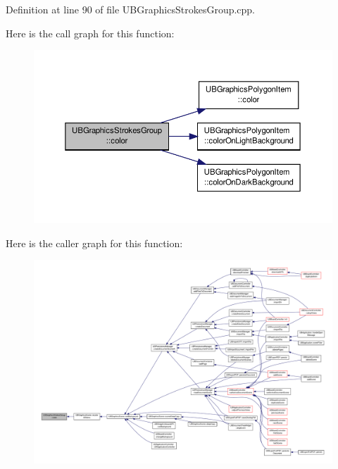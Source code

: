 Definition at line 90 of file U\-B\-Graphics\-Strokes\-Group.\-cpp.



Here is the call graph for this function\-:
\nopagebreak
\begin{figure}[H]
\begin{center}
\leavevmode
\includegraphics[width=350pt]{d3/d0b/class_u_b_graphics_strokes_group_a658c2ce6d14f05667601f76c5252a733_cgraph}
\end{center}
\end{figure}




Here is the caller graph for this function\-:
\nopagebreak
\begin{figure}[H]
\begin{center}
\leavevmode
\includegraphics[width=350pt]{d3/d0b/class_u_b_graphics_strokes_group_a658c2ce6d14f05667601f76c5252a733_icgraph}
\end{center}
\end{figure}


